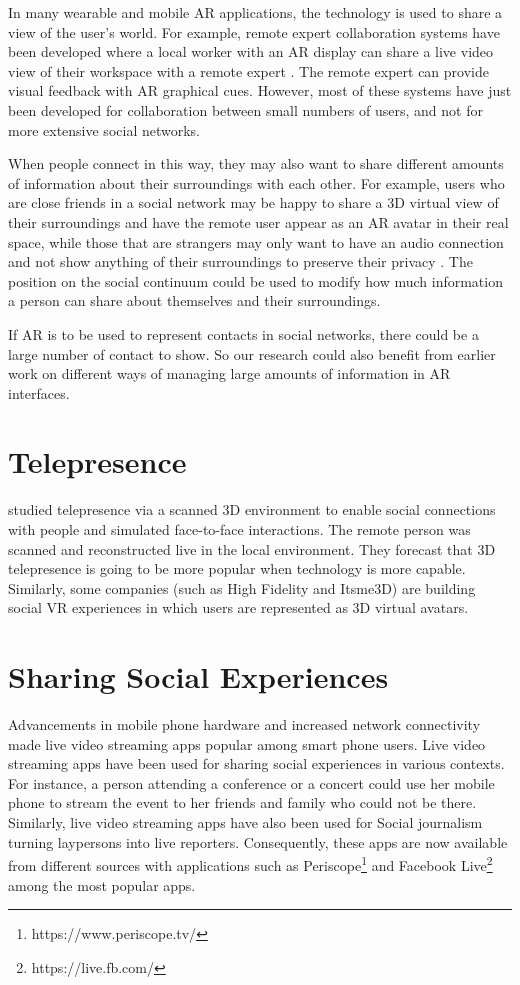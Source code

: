In many wearable and mobile AR applications, the technology is used to share a view of the user's world. For example, remote expert collaboration systems have been developed where a local worker with an AR display can share a live video view of their workspace with a remote expert \cite{Billinghurst2002}. The remote expert can provide visual feedback with AR graphical cues.  However, most of these systems have just been developed for collaboration between small numbers of users, and not for more extensive social networks.

When people connect in this way, they may also want to share different amounts of information about their surroundings with each other. For example, users who are close friends in a social network may be happy to share a 3D virtual view of their surroundings and have the remote user appear as an AR avatar in their real space, while those that are strangers may only want to have an audio connection and not show anything of their surroundings to preserve their privacy \cite{Oetzel2011}. The position on the social continuum could be used to modify how much information a person can share about themselves and their surroundings.

If AR is to be used to represent contacts in social networks, there could be a large number of contact to show. So our research could also benefit from earlier work on different ways of managing large amounts of information in AR interfaces.

\section{Telepresence}

\cite{Fuchs2014} studied telepresence via a scanned 3D environment to enable social connections with people and simulated face-to-face interactions. The remote person was scanned and reconstructed live in the local environment. They forecast that 3D telepresence is going to be more popular when technology is more capable. Similarly, some companies (such as High Fidelity and Itsme3D) are building social VR experiences in which users are represented as 3D virtual avatars.

\section{Sharing Social Experiences}

Advancements in mobile phone hardware and increased network connectivity made live video streaming apps popular among smart phone users. Live video streaming apps have been used for sharing social experiences in various contexts. For instance, a person attending a conference or a concert could use her mobile phone to stream the event to her friends and family who could not be there. Similarly, live video streaming apps have also been used for Social journalism turning laypersons into live reporters. Consequently, these apps are now available from different sources with applications such as Periscope\footnote{https://www.periscope.tv/} and Facebook Live\footnote{https://live.fb.com/} among the most popular apps. 

